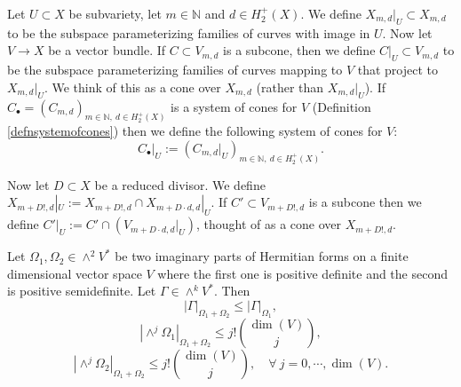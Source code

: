 \documentclass[10pt,a4paper]{amsart}
\newcommand{\bN}{\mathbb{N}}
\renewcommand{\leq}{\leqslant}
\begin{document}
\begin{defn} \label{defnrestrictionofcones}
	Let $U \subset X$ be subvariety, let $m \in \bN$ and $d \in H_2^+(X)$.
	We define  $X_{m,d}|_U \subset X_{m,d}$ to be the subspace parameterizing families of curves with image in $U$.
	Now let $V \to X$ be a vector bundle.
	If $C \subset V_{m,d}$ is a subcone, then we define $C|_U \subset V_{m,d}$ to be the subspace parameterizing families of curves mapping to $V$ that project to $X_{m,d}|_U$.
	We think of this as a cone over $X_{m,d}$ (rather than $X_{m,d}|_U$).
	If $C_\bullet = (C_{m,d})_{m \in \bN, \ d \in H_2^+(X)}$ is a system of cones for $V$ (Definition \ref{defnsystemofcones}) then we define the following system of cones for $V$:
	\begin{equation}
		C_\bullet|_U := (C_{m,d}|_U)_{m \in \bN, \ d \in H_2^+(X)}.
	\end{equation}

	Now let $D \subset X$ be a reduced divisor. We define $X_{m+D!,d}|_U := X_{m+D!,d} \cap X_{m+D \cdot d,d}|_U$.
	If $C' \subset V_{m+D!,d}$ is a subcone then we define $C'|_U := C' \cap (V_{m+D \cdot d,d}|_U)$, thought of as a cone over $X_{m+D!,d}$.
\end{defn}

\begin{lemma} \label{lemmaaboutpositivedefiniteforms}
	Let $\Omega_1, \Omega_2 \in \wedge^2 V^*$ be two imaginary parts of Hermitian forms on a finite dimensional vector space $V$ where the first one is positive definite and the second is positive semidefinite.
	Let $\Gamma \in \wedge^k V^*$.
	Then
	\begin{equation} \label{eqncomparisonofnorms}
		|\Gamma|_{\Omega_1+\Omega_2} \leq |\Gamma|_{\Omega_1},
	\end{equation}
	\begin{equation} \label{eqnomegaonenorm}
		|\wedge^j \Omega_1|_{\Omega_1+\Omega_2} \leq j! {\dim(V) \choose j},
	\end{equation}
	\begin{equation} \label{eqnomegaonenorm2}
		|\wedge^j \Omega_2|_{\Omega_1+\Omega_2} \leq j! {\dim(V) \choose j}, \quad \forall \ j = 0,\cdots,\dim(V).
	\end{equation}
\end{lemma}
\end{document}
